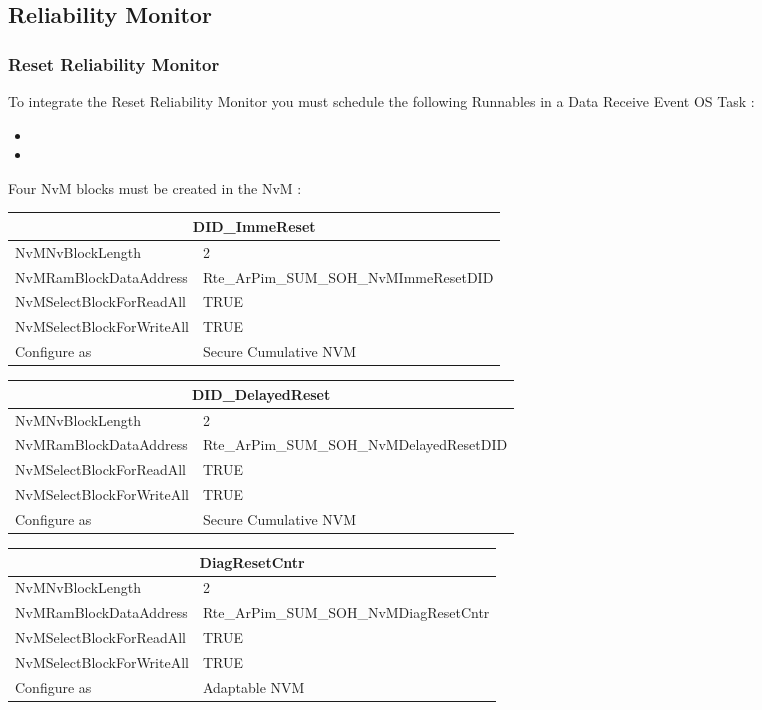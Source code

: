 \subsection{Reliability Monitor}
\subsubsection{Reset Reliability Monitor}

To integrate the Reset Reliability Monitor you must schedule the following Runnables in a Data Receive Event OS Task :

\begin{itemize}
    \item {}
    \item {}
\end{itemize}


Four NvM blocks must be created in the NvM :

\begin{tabular}{|l|p{8cm}|}\hline
\multicolumn{2}{|c|}{\textbf{DID\_ImmeReset}}\\\hline
NvMNvBlockLength&2\\\hline
NvMRamBlockDataAddress&Rte\_ArPim\_SUM\_SOH\_NvMImmeResetDID\\\hline
NvMSelectBlockForReadAll&TRUE\\\hline
NvMSelectBlockForWriteAll&TRUE\\\hline
Configure as&Secure Cumulative NVM\\\hline
\end{tabular}

\begin{tabular}{|l|p{8cm}|}\hline
\multicolumn{2}{|c|}{\textbf{DID\_DelayedReset}}\\\hline
NvMNvBlockLength&2\\\hline
NvMRamBlockDataAddress&Rte\_ArPim\_SUM\_SOH\_NvMDelayedResetDID\\\hline
NvMSelectBlockForReadAll&TRUE\\\hline
NvMSelectBlockForWriteAll&TRUE\\\hline
Configure as&Secure Cumulative NVM\\\hline
\end{tabular}

\begin{tabular}{|l|p{8cm}|}\hline
\multicolumn{2}{|c|}{\textbf{DiagResetCntr}}\\\hline
NvMNvBlockLength&2\\\hline
NvMRamBlockDataAddress&Rte\_ArPim\_SUM\_SOH\_NvMDiagResetCntr\\\hline
NvMSelectBlockForReadAll&TRUE\\\hline
NvMSelectBlockForWriteAll&TRUE\\\hline
Configure as&Adaptable NVM\\\hline
\end{tabular}


